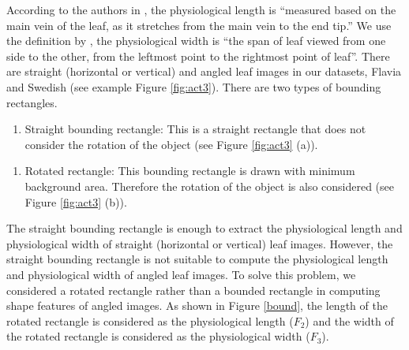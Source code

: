 \documentclass{article}
\newcommand{\tightlist}{%
\setlength{\itemsep}{0pt}\setlength{\parskip}{0pt}}
\begin{document}
According to the authors in \citet{articlepl}, the physiological
length is ``measured based on the main vein of the leaf, as it stretches
from the main vein to the end tip.'' We use the definition by \citet{articlepl}, the physiological width is ``the span of leaf viewed from
one side to the other, from the leftmost point to the rightmost point of
leaf''. There are straight (horizontal or vertical) and angled leaf
images in our datasets, Flavia and Swedish (see example Figure
\ref{fig:act3}). There are two types of bounding rectangles.

\begin{enumerate}
\def\labelenumi{\roman{enumi})}
\tightlist
\item
  Straight bounding rectangle: This is a straight rectangle that does not consider the rotation of the object (see Figure \ref{fig:act3}
  (a)).
\end{enumerate}

\begin{enumerate}
\def\labelenumi{\roman{enumi})}
\setcounter{enumi}{1}
\tightlist
\item
  Rotated rectangle: This bounding rectangle is drawn with minimum
  background area. Therefore the rotation of the object is also
  considered (see Figure \ref{fig:act3} (b)).
\end{enumerate}

The straight bounding rectangle is enough to extract the physiological
length and physiological width of straight (horizontal or vertical) leaf
images. However, the straight bounding rectangle is not suitable to
compute the physiological length and physiological width of angled leaf
images. To solve this problem, we considered a rotated rectangle rather
than a bounded rectangle in computing shape features of angled images. As
shown in Figure \ref{bound}, the length of the rotated rectangle is considered as the physiological length ($F_2$) and the width of the rotated rectangle is considered as the physiological width ($F_3$).
\end{document}
